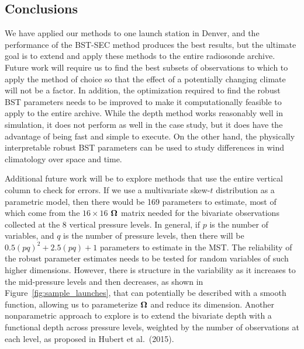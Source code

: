 \documentclass[12pt]{article}
\def\bOmega{{\ensuremath\boldsymbol{\Omega}}}
\def\bOmega{{\ensuremath\boldsymbol{\Omega}}}
\begin{document}
\begin{doublespacing}

\section{Conclusions}

We have applied our methods to one launch station in Denver, and the performance of the BST-SEC method produces the best results, but the ultimate goal is to extend and apply these methods to the entire radiosonde archive.  Future work will require us to find the best subsets of observations to which to apply the method of choice so that the effect of a potentially changing climate will not be a factor.  In addition, the optimization required to find the robust BST parameters needs to be improved to make it computationally feasible to apply to the entire archive.  While the depth method works reasonably well in simulation, it does not perform as well in the case study, but it does have the advantage of being fast and simple to execute.  On the other hand, the physically interpretable robust BST parameters can be used to study differences in wind climatology over space and time.

Additional future work  will be to explore methods that use the entire vertical column to check for errors.  If we use a multivariate skew-$t$ distribution as a parametric model, then there would be 169  parameters to estimate, most of which come from the $16\times 16$  $\bOmega$ matrix needed for the bivariate observations collected at the 8 vertical pressure levels. In general, if $p$ is the number of variables, and $q$ is the number of pressure levels, then there will be $0.5(pq)^2+2.5(pq)+1$  parameters to estimate in the MST.  The reliability of the robust parameter estimates needs to be tested for random variables of such higher dimensions.   However, there is structure in the variability as it increases to the mid-pressure levels and then decreases, as shown in Figure~\ref{fig:sample_launches}, that can potentially be described with a smooth function, allowing us to parameterize $\bOmega$ and reduce its dimension.   Another nonparametric approach to explore is to extend the bivariate depth with a  functional depth across pressure levels, weighted by the number of observations at each level, as proposed in  Hubert et al.~(2015).   

\end{doublespacing}
\end{document}
